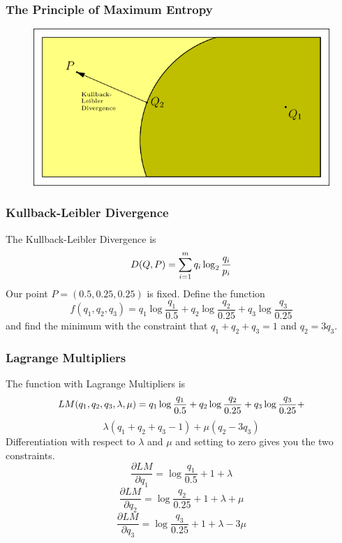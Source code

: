 \documentclass[xcolor=dvipsnames]{beamer}
\begin{document}
\begin{frame}
  \frametitle{The Principle of Maximum Entropy}
\begin{figure}[h]
\includegraphics[scale=1.0]{./diagrams/constraint-d.pdf}
\end{figure}
\end{frame}

\begin{frame}
  \frametitle{Kullback-Leibler Divergence}
  The Kullback-Leibler Divergence is
\begin{equation}
  \label{eq:kl}
  D(Q,P)=\sum_{i=1}^{m}q_{i}\log_{2}\frac{q_{i}}{p_{i}}\notag
\end{equation}
Our point $P=(0.5,0.25,0.25)$ is fixed. Define the function
\begin{equation}
  \label{eq:nughaoqu}
  f(q_{1},q_{2},q_{3})=q_{1}\log\frac{q_{1}}{0.5}+q_{2}\log\frac{q_{2}}{0.25}+q_{3}\log\frac{q_{3}}{0.25}
\end{equation}
and find the minimum with the constraint that $q_{1}+q_{2}+q_{3}=1$
and $q_{2}=3q_{3}$.
\end{frame}

\begin{frame}
  \frametitle{Lagrange Multipliers}
  The function with Lagrange Multipliers is
  \begin{equation}
    \label{eq:eoreaque}
    LM(q_{1},q_{2},q_{3},\lambda,\mu)=q_{1}\log\frac{q_{1}}{0.5}+q_{2}\log\frac{q_{2}}{0.25}+q_{3}\log\frac{q_{3}}{0.25}+\notag
  \end{equation}
  \begin{equation}
    \label{eq:okeexeim}
    \lambda(q_{1}+q_{2}+q_{3}-1)+\mu(q_{2}-3q_{3})
  \end{equation}
Differentiation with respect to $\lambda$ and $\mu$ and setting to
zero gives you the two constraints.
\begin{equation}
  \label{eq:iceekasu}
  \frac{\partial{}LM}{\partial{}q_{1}}=\log\frac{q_{1}}{0.5}+1+\lambda
\end{equation}
\begin{equation}
  \label{eq:theiquae}
  \frac{\partial{}LM}{\partial{}q_{2}}=\log\frac{q_{2}}{0.25}+1+\lambda+\mu
\end{equation}
\begin{equation}
  \label{eq:laxiexeo}
  \frac{\partial{}LM}{\partial{}q_{3}}=\log\frac{q_{3}}{0.25}+1+\lambda-3\mu
\end{equation}
\end{frame}
\end{document}
